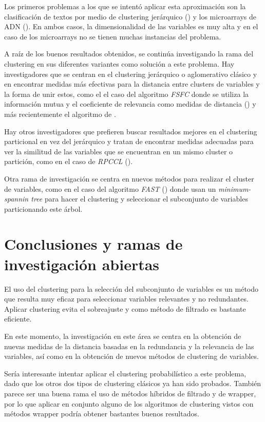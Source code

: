 \documentclass[a4paper,11pt]{article}
\begin{document}
Los primeros problemas a los que se intentó aplicar esta aproximación son la clasificación de textos por medio de clustering jerárquico (\cite{dhillon2003}) y los microarrays de ADN (\cite{yu2004}). En ambos casos, la dimensionalidad de las variables es muy alta y en el caso de los microarrays no se tienen muchas instancias del problema.

A raíz de los buenos resultados obtenidos, se continúa investigando la rama del clustering en sus diferentes variantes como solución a este problema. Hay investigadores que se centran en el clustering jerárquico o aglomerativo clásico y en encontrar medidas más efectivas para la distancia entre clusters de variables y la forma de unir estos, como el el caso del algoritmo \textit{FSFC} donde se utiliza la información mutua y el coeficiente de relevancia como medidas de distancia (\cite{hliu2011}) y más recientemente el algoritmo de \cite{dehghan2016}.

Hay otros investigadores que prefieren buscar resultados mejores en el clustering particional en vez del jerárquico y tratan de encontrar medidas adecuadas para ver la similitud de las variables que se encuentran en un mismo cluster o partición, como en el caso de \textit{RPCCL} (\cite{yiu2012}).

Otra rama de investigación se centra en nuevos métodos para realizar el cluster de variables, como en el caso del algoritmo \textit{FAST} (\cite{fast}) donde usan un \textit{minimum-spannin tree} para hacer el clustering y seleccionar el subconjunto de variables particionando este árbol.

\section{Conclusiones y ramas de investigación abiertas}

El uso del clustering para la selección del subconjunto de variables es un método que resulta muy eficaz para seleccionar variables relevantes y no redundantes. Aplicar clustering evita el sobreajuste y como método de filtrado es bastante eficiente.

En este momento, la investigación en este área se centra en la obtención de nuevas medidas de la distancia basadas en la redundancia y la relevancia de las variables, así como en la obtención de nuevos métodos de clustering de variables.

Sería interesante intentar aplicar el clustering probabilístico a este problema, dado que los otros dos tipos de clustering clásicos ya han sido probados. También parece ser una buena rama el uso de métodos híbridos de filtrado y de wrapper, por lo que aplicar en conjunto alguno de los algoritmos de clustering vistos con métodos wrapper podría obtener bastantes buenos resultados.
\end{document}
